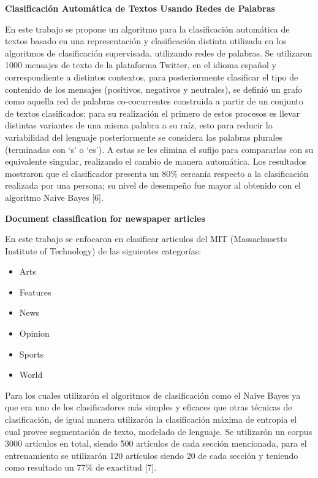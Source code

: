 \begin{large}
	 \textbf{Clasificación Automática de Textos Usando Redes de Palabras}\\
\end{large}

En este trabajo se propone un algoritmo para la clasificación automática de textos basado en una representación y clasificación distinta utilizada en los algoritmos de clasificación supervisada, utilizando redes de palabras.
Se utilizaron 1000 mensajes de texto de la plataforma Twitter, en el idioma español y correspondiente a distintos contextos, para posteriormente clasificar el tipo de contenido de los mensajes (positivos, negativos y neutrales), se definió un grafo como aquella red de palabras co-cocurrentes construida a partir de un conjunto de textos clasificados; para su realización el primero de estos procesos es llevar distintas variantes de una misma palabra a su raíz, esto para reducir la variabilidad del lenguaje posteriormente se considera las palabras plurales (terminadas con ‘s’ o ‘es’). A estas se les elimina el sufijo para compararlas con su equivalente singular, realizando el cambio de manera automática.
Los resultados mostraron que el clasificador presenta un 80\% cercanía respecto a la clasificación realizada por una persona; su nivel de desempeño fue mayor al obtenido con el algoritmo Naive Bayes [6].\\


\begin{large}
	 \textbf{Document classification for newspaper articles}\\
\end{large}

En este trabajo se enfocaron en clasificar articulos del MIT (Massachusetts Institute of Technology) de las siguientes categorías:

	\begin{itemize}
		\item Arts
		\item Features
		\item News
		\item Opinion
		\item Sports
		\item World
	\end{itemize}
Para los cuales utilizarón el algoritmos de clasificación como el Naive Bayes ya que era uno de los clasificadores más simples y eficaces que otras técnicas de clasificación, de igual manera utilizarón la clasificación máxima de entropia el cual provee segmentación de texto, modelado de lenguaje.
Se utilizarón un corpus 3000 artículos en total, siendo 500 artículos de cada sección mencionada, para el entrenamiento se utilizarón 120 artículos siendo 20 de cada sección y teniendo como resultado un 77\% de exactitud [7].


